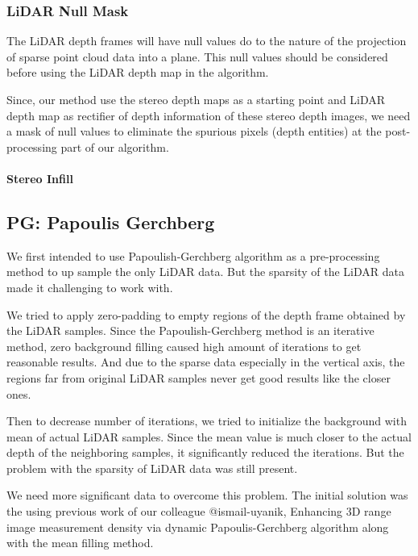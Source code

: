 \documentclass[conference]{IEEEtran}
\begin{document}
\subsubsection{LiDAR Null Mask}

The LiDAR depth frames will have null values do to the nature of the projection of sparse point cloud data into a plane. This null values should be considered before using the LiDAR depth map in the algorithm.

Since, our method use the stereo depth maps as a starting point and LiDAR depth map as rectifier of depth information of these stereo depth images, we need a mask of null values to eliminate the spurious pixels (depth entities) at the post-processing part of our algorithm.

\paragraph{Stereo Infill}

\subsection{PG: Papoulis Gerchberg}
We first intended to use Papoulish-Gerchberg algorithm as a pre-processing method to up sample the only LiDAR data. But the sparsity of the LiDAR data made it challenging to work with.

We tried to apply zero-padding to empty regions of the depth frame obtained by the LiDAR samples. Since the Papoulish-Gerchberg method is an iterative method, zero background filling caused high amount of iterations to get reasonable results. And due to the sparse data especially in the vertical axis, the regions far from original LiDAR samples never get good results like the closer ones.

Then to decrease number of iterations, we tried to initialize the background with mean of actual LiDAR samples. Since the mean value is much closer to the actual depth of the neighboring samples, it significantly reduced the iterations. But the problem with the sparsity of LiDAR data was still present.

We need more significant data to overcome this problem. The initial solution was the using previous work of our colleague @ismail-uyanik, {Enhancing 3D range image measurement density via dynamic Papoulis-Gerchberg algorithm} along with the mean filling method.
\end{document}
